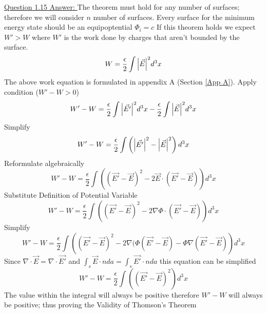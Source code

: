 \documentclass[12pt]{article}
\begin{document}
    \underline{Question 1.15 Answer: }
    The theorem must hold for any number of surfaces; therefore we will consider $n$ number of surfaces.
    \newline Every surface for the minimum energy state should be an equipoptential $\Phi_i = c$
    \newline If this theorem holds we expect $W' > W$ where $W'$ is the work done by charges that aren't bounded by the surface.
    \begin{equation} \label{eq: }
        W = \frac{\epsilon}{2} \int \abs{\vec{E}}^2 d^3x     
    \end{equation}
    The above work equation is formulated in appendix A (Section \ref{App A}).
    \newline Apply condition ($W' - W > 0$)
    \begin{equation} \label{eq: }
        W'-W = \frac{\epsilon}{2} \int \abs{\vec{E'}}^2 d^3x - \frac{\epsilon}{2} \int \abs{\vec{E}}^2 d^3x
    \end{equation}
    Simplify
    \begin{equation} \label{eq: }
        W'-W = \frac{\epsilon}{2} \int \left(\abs{\vec{E'}}^2 - \abs{\vec{E}}^2 \right) d^3x
    \end{equation}
    Reformulate algebraically
    \begin{equation}
        W'-W = \frac{\epsilon}{2} \int \left((\vec{E'} - \vec{E})^2 - 2 \vec{E} \cdot (\vec{E'} - \vec{E}) \right)d^3x
    \end{equation}
    Substitute Definition of Potential Variable
    \begin{equation} \label{eq: }
        W'-W = \frac{\epsilon}{2} \int \left((\vec{E'} - \vec{E})^2 - 2 \nabla \Phi \cdot (\vec{E'} - \vec{E}) \right)d^3x        
    \end{equation}
    Simplify
    \begin{equation} \label{eq: }
        W'-W = \frac{\epsilon}{2} \int \left((\vec{E'} - \vec{E})^2 - 2 \nabla (\Phi (\vec{E'} - \vec{E}) - \Phi \nabla (\vec{E'} - \vec{E}) \right)d^3x        
    \end{equation}
    Since $\nabla \cdot \vec{E} = \nabla \cdot \vec{E'}$ and $\int_s \vec{E} \cdot n da = \int_s \vec{E'} \cdot n da$ this equation can be simplified
    \begin{equation} \label{eq: }
        W'-W = \frac{\epsilon}{2} \int \left((\vec{E'} - \vec{E})^2  \right)d^3x        
    \end{equation}    
    The value within the integral will always be positive therefore $W' - W$ will always be positive; thus proving the Validity of Thomson's Theorem
\end{document}

